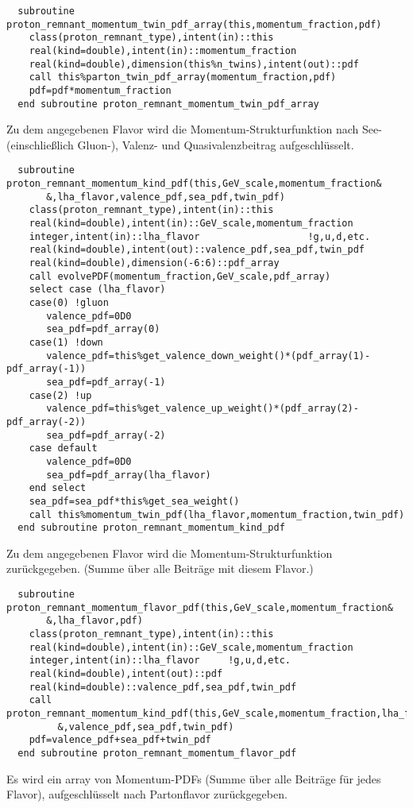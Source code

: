 \begin{Verbatim}
  subroutine proton_remnant_momentum_twin_pdf_array(this,momentum_fraction,pdf)
    class(proton_remnant_type),intent(in)::this
    real(kind=double),intent(in)::momentum_fraction
    real(kind=double),dimension(this%n_twins),intent(out)::pdf
    call this%parton_twin_pdf_array(momentum_fraction,pdf)
    pdf=pdf*momentum_fraction
  end subroutine proton_remnant_momentum_twin_pdf_array
\end{Verbatim}  
Zu dem angegebenen Flavor wird die Momentum-Strukturfunktion nach See- (einschließlich Gluon-), Valenz-  und Quasivalenzbeitrag aufgeschlüsselt.
\begin{Verbatim}
  subroutine proton_remnant_momentum_kind_pdf(this,GeV_scale,momentum_fraction&
       &,lha_flavor,valence_pdf,sea_pdf,twin_pdf)
    class(proton_remnant_type),intent(in)::this
    real(kind=double),intent(in)::GeV_scale,momentum_fraction
    integer,intent(in)::lha_flavor                   !g,u,d,etc.
    real(kind=double),intent(out)::valence_pdf,sea_pdf,twin_pdf
    real(kind=double),dimension(-6:6)::pdf_array
    call evolvePDF(momentum_fraction,GeV_scale,pdf_array)
    select case (lha_flavor)
    case(0) !gluon
       valence_pdf=0D0
       sea_pdf=pdf_array(0)
    case(1) !down
       valence_pdf=this%get_valence_down_weight()*(pdf_array(1)-pdf_array(-1))
       sea_pdf=pdf_array(-1)
    case(2) !up
       valence_pdf=this%get_valence_up_weight()*(pdf_array(2)-pdf_array(-2))
       sea_pdf=pdf_array(-2)
    case default
       valence_pdf=0D0
       sea_pdf=pdf_array(lha_flavor)
    end select
    sea_pdf=sea_pdf*this%get_sea_weight()
    call this%momentum_twin_pdf(lha_flavor,momentum_fraction,twin_pdf)
  end subroutine proton_remnant_momentum_kind_pdf
\end{Verbatim}
Zu dem angegebenen Flavor wird die Momentum-Strukturfunktion zurückgegeben. (Summe über alle Beiträge mit diesem Flavor.)
\begin{Verbatim}
  subroutine proton_remnant_momentum_flavor_pdf(this,GeV_scale,momentum_fraction&
       &,lha_flavor,pdf)
    class(proton_remnant_type),intent(in)::this
    real(kind=double),intent(in)::GeV_scale,momentum_fraction
    integer,intent(in)::lha_flavor     !g,u,d,etc.
    real(kind=double),intent(out)::pdf
    real(kind=double)::valence_pdf,sea_pdf,twin_pdf
    call proton_remnant_momentum_kind_pdf(this,GeV_scale,momentum_fraction,lha_flavor&
         &,valence_pdf,sea_pdf,twin_pdf)
    pdf=valence_pdf+sea_pdf+twin_pdf
  end subroutine proton_remnant_momentum_flavor_pdf
\end{Verbatim}  
Es wird ein array von Momentum-PDFs (Summe über alle Beiträge für jedes Flavor), aufgeschlüsselt nach Partonflavor zurückgegeben.

